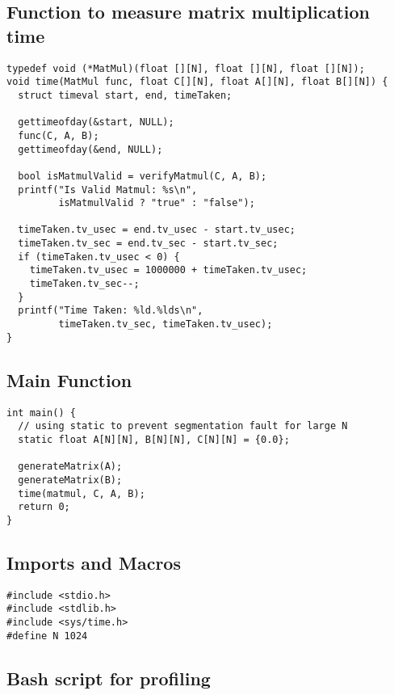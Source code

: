 \documentclass[12pt, letterpaper]{article}
\begin{document}
\subsection{Function to measure matrix multiplication time}
\label{sec:code-time}

\begin{verbatim}
typedef void (*MatMul)(float [][N], float [][N], float [][N]);
void time(MatMul func, float C[][N], float A[][N], float B[][N]) {
  struct timeval start, end, timeTaken;

  gettimeofday(&start, NULL);
  func(C, A, B);
  gettimeofday(&end, NULL);

  bool isMatmulValid = verifyMatmul(C, A, B);
  printf("Is Valid Matmul: %s\n",
         isMatmulValid ? "true" : "false");

  timeTaken.tv_usec = end.tv_usec - start.tv_usec;
  timeTaken.tv_sec = end.tv_sec - start.tv_sec;
  if (timeTaken.tv_usec < 0) {
    timeTaken.tv_usec = 1000000 + timeTaken.tv_usec;
    timeTaken.tv_sec--;
  }
  printf("Time Taken: %ld.%lds\n",
         timeTaken.tv_sec, timeTaken.tv_usec);
}
\end{verbatim}

\subsection{Main Function}
\label{sec:code-main}

\begin{verbatim}
int main() {
  // using static to prevent segmentation fault for large N
  static float A[N][N], B[N][N], C[N][N] = {0.0};

  generateMatrix(A);
  generateMatrix(B);
  time(matmul, C, A, B);
  return 0;
}
\end{verbatim}

\subsection{Imports and Macros}
\label{sec:code-imports}

\begin{verbatim}
#include <stdio.h>
#include <stdlib.h>
#include <sys/time.h>
#define N 1024
\end{verbatim}

\subsection{Bash script for profiling}
\label{sec:code-profile}
\end{document}
